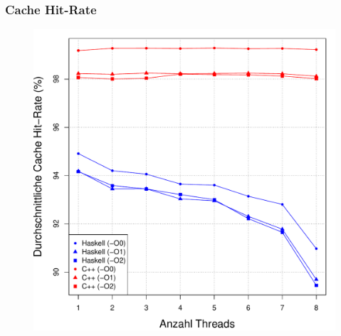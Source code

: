 \documentclass[presentation, shownotes]{beamer}
\begin{document}
\begin{frame}
\frametitle{Cache Hit-Rate}
    \begin{figure}
    \centering
    \includegraphics[height=.8\textheight]{cache_hit_rate.pdf}
    \end{figure}
\end{frame}
\end{document}

